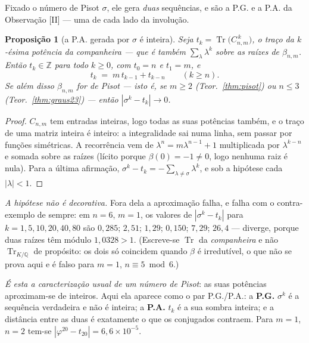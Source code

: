 \documentclass[11pt,a4paper]{article}
\theoremstyle{plain}
\newtheorem{proposicao}[teorema]{Proposição}
\theoremstyle{definition}
\theoremstyle{remark}
\newcommand{\Q}{\mathbb{Q}}
\newcommand{\Z}{\mathbb{Z}}
\providecommand{\Comp}[2]{C_{#1,#2}}
\begin{document}
Fixado o número de Pisot $\sigma$, ele gera \emph{duas} sequências, e são a P.G. e a P.A. da
Observação [II] --- uma de cada lado da involução.

\begin{proposicao}[a P.A. gerada por $\sigma$ é inteira]\label{prop:tracos}
Seja $t_k = \operatorname{Tr}\big(\Comp{n}{m}^{\,k}\big)$, o traço da $k$-ésima potência da
companheira --- que é também $\sum_\lambda \lambda^k$ sobre as raízes de $\beta_{n,m}$. Então
$t_k \in \Z$ para todo $k\geq0$, com $t_0 = n$ e $t_1 = m$, e
\[
  t_k \;=\; m\,t_{k-1} + t_{k-n} \qquad (k \geq n) .
\]
Se além disso $\beta_{n,m}$ for de Pisot --- isto é, se $m\geq2$ (Teor.~\ref{thm:pisot}) ou
$n\leq3$ (Teor.~\ref{thm:graus23}) --- então $|\sigma^k - t_k| \to 0$.
\end{proposicao}

\begin{proof}
$\Comp{n}{m}$ tem entradas inteiras, logo todas as suas potências também, e o traço de uma matriz
inteira é inteiro: a integralidade sai numa linha, sem passar por funções simétricas. A recorrência
vem de $\lambda^n = m\lambda^{n-1}+1$ multiplicada por $\lambda^{k-n}$ e somada sobre as raízes
(lícito porque $\beta(0) = -1 \neq 0$, logo nenhuma raiz é nula). Para a última afirmação,
$\sigma^k - t_k = -\sum_{\lambda\neq\sigma}\lambda^k$, e sob a hipótese cada $|\lambda|<1$.
\end{proof}

\noindent \emph{A hipótese não é decorativa.} Fora dela a aproximação falha, e falha com o
contra-exemplo de sempre: em $n=6$, $m=1$, os valores de $|\sigma^k-t_k|$ para
$k=1,5,10,20,40,80$ são $0{,}285$; $2{,}51$; $1{,}29$; $0{,}150$; $7{,}29$; $26{,}4$ --- diverge,
porque duas raízes têm módulo $1{,}0328>1$. (Escreve-se $\operatorname{Tr}$ da \emph{companheira} e
não $\operatorname{Tr}_{K/\Q}$ de propósito: os dois só coincidem quando $\beta$ é irredutível, o
que não se prova aqui e é falso para $m=1$, $n\equiv5 \bmod 6$.)

\noindent \emph{É esta a caracterização usual de um número de Pisot}: as suas potências aproximam-se
de inteiros. Aqui ela aparece como o par P.G./P.A.: a \textbf{P.G.} $\sigma^k$ é a sequência
verdadeira e não é inteira; a \textbf{P.A.} $t_k$ é a sua sombra inteira; e a distância entre as
duas é exatamente o que os conjugados contraem. Para $m=1$, $n=2$ tem-se
$|\varphi^{20}-t_{20}| = 6{,}6\times10^{-5}$.
\end{document}
